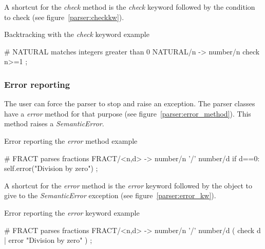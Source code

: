 A shortcut for the \emph{check} method is the \emph{check} keyword followed by the condition to check (see figure~\ref{parser:checkkw}).

\begin{code}
\caption{Backtracking with the \emph{check} keyword example}	\label{parser:checkkw}
\begin{verbatimtab}[4]
	# NATURAL matches integers greater than 0
	NATURAL/n ->
		number/n
		check {{ n>=1 }}
		;
\end{verbatimtab}
\end{code}

\subsubsection{Error reporting}

The user can force the parser to stop and raise an exception.
The parser classes have a \emph{error} method for that purpose (see figure~\ref{parser:error_method}).
This method raises a \emph{SemanticError}.

\begin{code}
\caption{Error reporting the \emph{error} method example}	\label{parser:error_method}
\begin{verbatimtab}[4]
	# FRACT parses fractions
	FRACT/<n,d> ->
		number/n '/' number/d
		{{ if d==0: self.error("Division by zero") }}
		;
\end{verbatimtab}
\end{code}

A shortcut for the \emph{error} method is the \emph{error} keyword followed by the object to give to the \emph{SemanticError} exception (see figure~\ref{parser:error_kw}).

\begin{code}
\caption{Error reporting the \emph{error} keyword example}	\label{parser:error_kw}
\begin{verbatimtab}[4]
	# FRACT parses fractions
	FRACT/<n,d> ->
		number/n '/' number/d
		( check d | error "Division by zero" )
		;
\end{verbatimtab}
\end{code}

